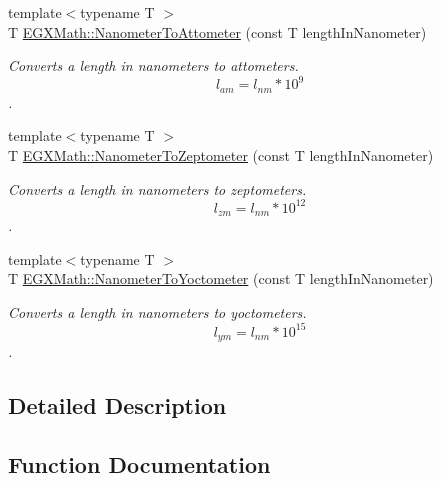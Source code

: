 \begin{DoxyCompactItemize}
{\footnotesize template$<$typename T $>$ }\\T \mbox{\hyperlink{group___e_g_x_math-_conversions-_length_conversions-_nanometer-_s_i_ga6bb90e8a7f98c79dc2ebbb8a46535fe0}{E\+G\+X\+Math\+::\+Nanometer\+To\+Attometer}} (const T length\+In\+Nanometer)
\begin{DoxyCompactList}\small\item\em Converts a length in nanometers to attometers. \[ l_{am}=l_{nm} * 10^{9} \]. \end{DoxyCompactList}\item 
{\footnotesize template$<$typename T $>$ }\\T \mbox{\hyperlink{group___e_g_x_math-_conversions-_length_conversions-_nanometer-_s_i_ga3104d856008f94fc14378e95cfbe771f}{E\+G\+X\+Math\+::\+Nanometer\+To\+Zeptometer}} (const T length\+In\+Nanometer)
\begin{DoxyCompactList}\small\item\em Converts a length in nanometers to zeptometers. \[ l_{zm}=l_{nm} * 10^{12} \]. \end{DoxyCompactList}\item 
{\footnotesize template$<$typename T $>$ }\\T \mbox{\hyperlink{group___e_g_x_math-_conversions-_length_conversions-_nanometer-_s_i_gab447c3aa3d215a1030a63e28f9aca1c1}{E\+G\+X\+Math\+::\+Nanometer\+To\+Yoctometer}} (const T length\+In\+Nanometer)
\begin{DoxyCompactList}\small\item\em Converts a length in nanometers to yoctometers. \[ l_{ym}=l_{nm} * 10^{15} \]. \end{DoxyCompactList}\end{DoxyCompactItemize}


\subsection{Detailed Description}


\subsection{Function Documentation}
\mbox{\label{group___e_g_x_math-_conversions-_length_conversions-_nanometer-_s_i_ga6bb90e8a7f98c79dc2ebbb8a46535fe0}} 
